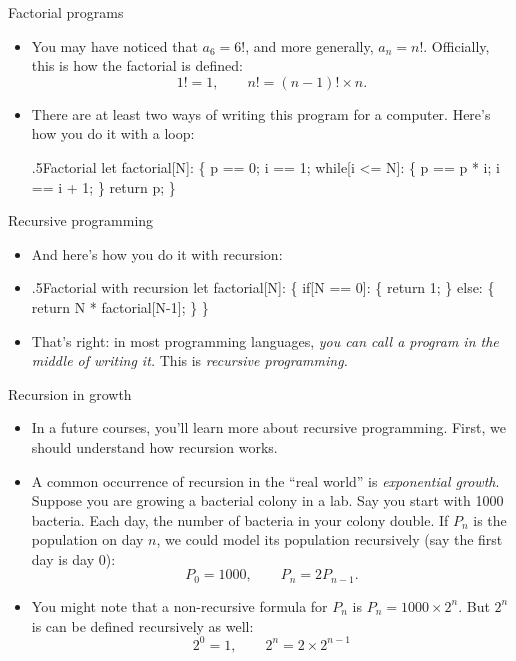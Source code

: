 \documentclass[11pt,aspectratio=1610,handout]{beamer}
\begin{document}
\begin{frame}[fragile]{Factorial programs}
	\begin{itemize} 
		\item You may have noticed that $a_6 = 6!$, and more generally, $a_n = n!$. Officially, this is how the factorial is defined: \p
		$$		1! = 1, \qquad n! = (n-1)! \times n.$$
		\item There are at least two ways of writing this program for a computer. Here's how you do it with a loop: \p
	\vspace{-7mm}\begin{code}{.5}{Factorial}
		let factorial[N]:
		\{
		p == 0;
		i == 1;
		while[i <= N]:
		\{
		p == p * i;
		i == i + 1;
		\}
		return p;
		\}\end{code}
\end{itemize}
\end{frame}

\begin{frame}[fragile]{Recursive programming}
	\begin{itemize}
		\item And here's how you do it with recursion: 
	
	\item\begin{code}{.5}{Factorial with recursion}
		let factorial[N]:
		\{
		if[N == 0]:
		\{
		return 1;
		\}
		else:
		\{
		return N * factorial[N-1];
		\}
		\}
	\end{code}


		\item That's right: in most programming languages, \emph{you can call a program in the middle of writing it.} This is \emph{recursive programming.} 
	\end{itemize}
\end{frame}

\begin{frame}{Recursion in growth}
	\begin{itemize}
		\item In a future courses, you'll learn more about recursive programming. First, we should understand how recursion works. \p
		
		\item A common occurrence of recursion in the ``real world'' is \emph{exponential growth}. \p Suppose you are growing a bacterial colony in a lab. Say you start with 1000 bacteria. Each day, the number of bacteria in your colony double. \p If $P_n$ is the population on day $n$, we could model its population recursively (say the first day is day 0): 
		\[
		P_0 = 1000, \qquad P_n = 2P_{n-1}.
		\] \p
		\item You might note that a non-recursive formula for $P_n$ is $P_n = 1000 \times 2^{n}$. \p But $2^n$ is can be defined recursively as well: \p
		\[
		2^0 = 1, \qquad 2^n = 2 \times 2^{n-1}
		\]
	\end{itemize}
\end{frame}
\end{document}
